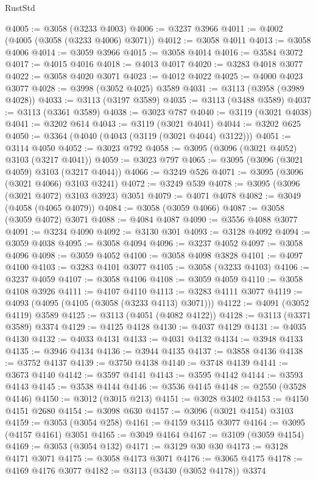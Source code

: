 \begin{lexlean}{RustStd}
\begin{coremodule}
{\begin{coremodule}
{{{{{{{{{{{{{{{{{{{{{{{{{{{{{{{{@4005 := @3058 (@3233 @4003)
@4006 := @3237 @3966
@4011 := @4002 (@4005 (@3058 (@3233 @4006) @3071))
@4012 := @3058 @4011
@4013 := @3058 @4006
@4014 := @3059 @3966
@4015 := @3058 @4014
@4016 := @3584 @3072
@4017 := @4015 @4016
@4018 := @4013 @4017
@4020 := @3283 @4018 @3077
@4022 := @3058 @4020 @3071
@4023 := @4012 @4022
@4025 := @4000 @4023 @3077
@4028 := @3998 (@3052 @4025) @3589
@4031 := @3113 (@3958 (@3989 @4028))
@4033 := @3113 (@3197 @3589)
@4035 := @3113 (@3488 @3589)
@4037 := @3113 (@3361 @3589)
@4038 := @3023 @787
@4040 := @3119 (@3021 @4038)
@4041 := @3202 @614
@4043 := @3119 (@3021 @4041)
@4044 := @3202 @625
@4050 := @3364 (@4040 (@4043 (@3119 (@3021 @4044) @3122)))
@4051 := @3114 @4050
@4052 := @3023 @792
@4058 := @3095 (@3096 (@3021 @4052) @3103 (@3217 @4041))
@4059 := @3023 @797
@4065 := @3095 (@3096 (@3021 @4059) @3103 (@3217 @4044))
@4066 := @3249 @526
@4071 := @3095 (@3096 (@3021 @4066) @3103 @3241)
@4072 := @3249 @539
@4078 := @3095 (@3096 (@3021 @4072) @3103 @3923) @3051
@4079 := @4071 @4078
@4082 := @3049 (@4058 (@4065 @4079))
@4084 := @3058 (@3059 @4066)
@4087 := @3058 (@3059 @4072) @3071
@4088 := @4084 @4087
@4090 := @3556 @4088 @3077
@4091 := @3234 @4090
@4092 := @3130 @301
@4093 := @3128 @4092
@4094 := @3059 @4038
@4095 := @3058 @4094
@4096 := @3237 @4052
@4097 := @3058 @4096
@4098 := @3059 @4052
@4100 := @3058 @4098 @3828
@4101 := @4097 @4100
@4103 := @3283 @4101 @3077
@4105 := @3058 (@3233 @4103)
@4106 := @3237 @4059
@4107 := @3058 @4106
@4108 := @3059 @4059
@4110 := @3058 @4108 @3926
@4111 := @4107 @4110
@4113 := @3283 @4111 @3077
@4119 := @4093 (@4095 (@4105 (@3058 (@3233 @4113) @3071)))
@4122 := @4091 (@3052 @4119) @3589
@4125 := @3113 (@4051 (@4082 @4122))
@4128 := @3113 (@3371 @3589) @3374
@4129 := @4125 @4128
@4130 := @4037 @4129
@4131 := @4035 @4130
@4132 := @4033 @4131
@4133 := @4031 @4132
@4134 := @3948 @4133
@4135 := @3946 @4134
@4136 := @3944 @4135
@4137 := @3858 @4136
@4138 := @3752 @4137
@4139 := @3750 @4138
@4140 := @3748 @4139
@4141 := @3673 @4140
@4142 := @3597 @4141
@4143 := @3595 @4142
@4144 := @3593 @4143
@4145 := @3538 @4144
@4146 := @3536 @4145
@4148 := @2550 (@3528 @4146)
@4150 := @3012 (@3015 @213)
@4151 := @3028 @3402
@4153 := @4150 @4151 @2680
@4154 := @3098 @630
@4157 := @3096 (@3021 @4154) @3103
@4159 := @3053 (@3054 @258)
@4161 := @4159 @3415 @3077
@4164 := @3095 (@4157 @4161) @3051
@4165 := @3049 @4164
@4167 := @3109 (@3059 @4154)
@4169 := @3053 (@3054 @132)
@4171 := @3129 @30 @30
@4173 := @3128 @4171 @3071
@4175 := @3058 @4173 @3071
@4176 := @3065 @4175
@4178 := @4169 @4176 @3077
@4182 := @3113 (@3430 (@3052 @4178)) @3374
}}}}}}}}}}}}}}}}}}}}}}}}}}}}}}}}
\end{coremodule}}
\end{coremodule}
\end{lexlean}
